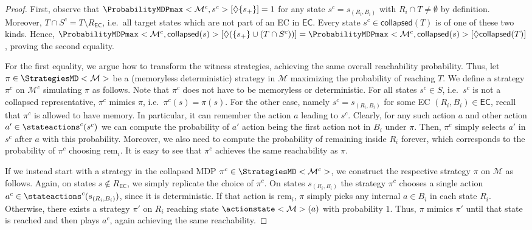 \documentclass{article}
\newcommand{\unionSym}{\cup}
\newcommand{\unionBin}{\mathbin{\unionSym}}
\newcommand{\intersectionSym}{\cap}
\newcommand{\intersectionBin}{\mathbin{\intersectionSym}}
\newcommand{\union}{\unionBin}
\newcommand{\intersection}{\intersectionBin}
\newcommand{\MDP}{\mathcal{M}}
\newcommand{\States}{S}
\newcommand{\strategy}{\pi}
\newcommand{\reach}{\Diamond}
\newcommand{\targetstate}{s_+}
\newcommand{\targetset}{T}
\newcommand{\ecremain}{\mathrm{rem}}
\newcommand{\eccollapsed}{\mathsf{collapsed}}
\newcommand{\algoecs}{\mathsf{EC}}
\begin{document}
\begin{proof}
	First, observe that $\ProbabilityMDPmax<\MDP^c, s^c>[\reach \{\targetstate\}] = 1$ for any state $s^c = s_{(R_i, B_i)}$ with $R_i \intersection \targetset \neq \emptyset$ by definition.
	Moreover, $\targetset \intersection \States^c = \targetset \setminus R_\algoecs$, i.e.\ all target states which are not part of an EC in $\algoecs$.
	Every state $s^c \in \eccollapsed(\targetset)$ is of one of these two kinds.
	Hence, $\ProbabilityMDPmax<\MDP^c, \eccollapsed(s)>[\reach (\{\targetstate\} \union (\targetset \intersection \States^c))] = \ProbabilityMDPmax<\MDP^c, \eccollapsed(s)>[\reach \eccollapsed(\targetset)]$, proving the second equality.

	For the first equality, we argue how to transform the witness strategies, achieving the same overall reachability probability.
	Thus, let $\strategy \in \StrategiesMD<\MDP>$ be a (memoryless deterministic) strategy in $\MDP$ maximizing the probability of reaching $\targetset$.
	We define a strategy $\strategy^c$ on $\MDP^c$ simulating $\strategy$ as follows.
	Note that $\strategy^c$ does not have to be memoryless or deterministic.
	For all states $s^c \in \States$, i.e.\ $s^c$ is not a collapsed representative, $\strategy^c$ mimics $\strategy$, i.e.\ $\strategy^c(s) = \strategy(s)$.
	For the other case, namely $s^c = s_{(R_i, B_i)}$ for some EC $(R_i, B_i) \in \algoecs$, recall that $\strategy^c$ is allowed to have memory.
	In particular, it can remember the action $a$ leading to $s^c$.
	Clearly, for any such action $a$ and other action $a' \in \stateactions^c(s^c)$ we can compute the probability of $a'$ action being the first action not in $B_i$ under $\strategy$.
	Then, $\strategy^c$ simply selects $a'$ in $s^c$ after $a$ with this probability.
	Moreover, we also need to compute the probability of remaining inside $R_i$ forever, which corresponds to the probability of $\strategy^c$ choosing $\ecremain_i$.
	It is easy to see that $\strategy^c$ achieves the same reachability as $\strategy$.

	If we instead start with a strategy in the collapsed MDP $\strategy^c \in \StrategiesMD<\MDP^c>$, we construct the respective strategy $\strategy$ on $\MDP$ as follows.
	Again, on states $s \notin R_\algoecs$, we simply replicate the choice of $\strategy^c$.
	On states $s_{(R_i, B_i)}$ the strategy $\strategy^c$ chooses a single action $a^c \in \stateactions^c(s_{(R_i, B_i)})$, since it is deterministic.
	If that action is $\ecremain_i$, $\strategy$ simply picks any internal $a \in B_i$ in each state $R_i$.
	Otherwise, there exists a strategy $\strategy'$ on $R_i$ reaching state $\actionstate<\MDP>(a)$ with probability $1$.
	Thus, $\strategy$ mimics $\strategy'$ until that state is reached and then plays $a^c$, again achieving the same reachability. 
\end{proof}
\end{document}
